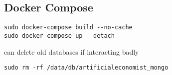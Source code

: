 \subsection{Docker Compose}

\begin{verbatim}
sudo docker-compose build --no-cache
sudo docker-compose up --detach
\end{verbatim}


can delete old databases if interacting badly

\begin{verbatim}
sudo rm -rf /data/db/artificialeconomist_mongo
\end{verbatim}
